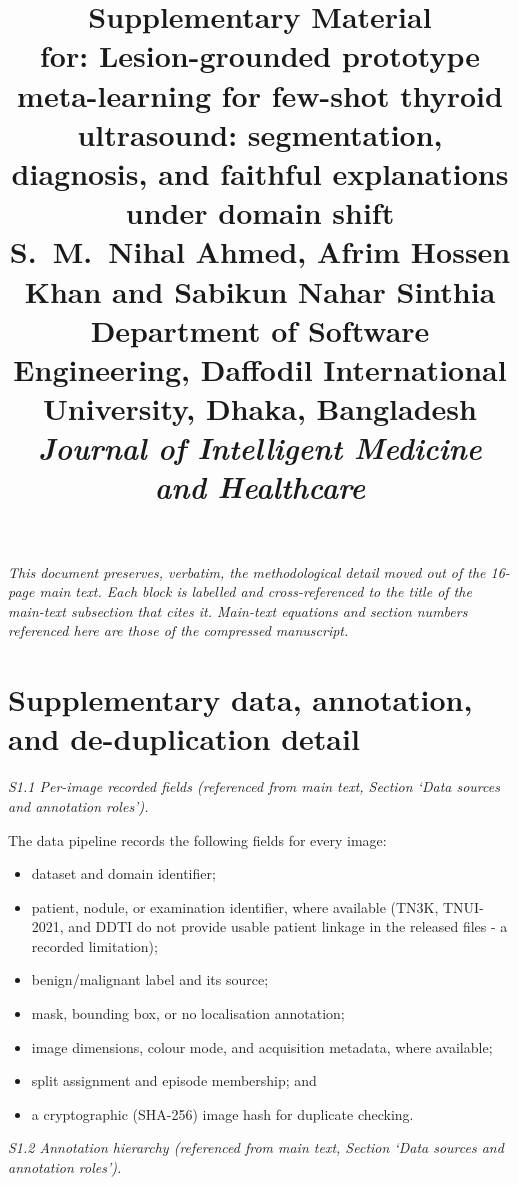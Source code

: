 \documentclass[11pt]{article}
\title{\textbf{Supplementary Material}\\[4pt]
\normalsize for: Lesion-grounded prototype meta-learning for few-shot thyroid
ultrasound: segmentation, diagnosis, and faithful explanations under
domain shift\\[4pt]
\small S.~M.~Nihal Ahmed, Afrim Hossen Khan and Sabikun Nahar Sinthia\\[2pt]
\small Department of Software Engineering, Daffodil International University, Dhaka, Bangladesh\\[4pt]
\small \emph{Journal of Intelligent Medicine and Healthcare}}
\author{}
\date{}
\begin{document}
\maketitle

\noindent\emph{This document preserves, verbatim, the methodological
detail moved out of the 16-page main text. Each block is labelled and
cross-referenced to the title of the main-text subsection that cites
it. Main-text equations and section numbers referenced here are those
of the compressed manuscript.}


\section{Supplementary data, annotation, and de-duplication detail}\label{sm:data}

\noindent\emph{S1.1 Per-image recorded fields (referenced from main text, Section `Data sources and annotation roles').}

The data pipeline records the following fields for every image:

\begin{itemize}
  \item dataset and domain identifier;
  \item patient, nodule, or examination identifier, where available
  (TN3K, TNUI-2021, and DDTI do not provide usable patient linkage in the
  released files - a recorded limitation);
  \item benign/malignant label and its source;
  \item mask, bounding box, or no localisation annotation;
  \item image dimensions, colour mode, and acquisition metadata, where
  available;
  \item split assignment and episode membership; and
  \item a cryptographic (SHA-256) image hash for duplicate checking.
\end{itemize}

\noindent\emph{S1.2 Annotation hierarchy (referenced from main text, Section `Data sources and annotation roles').}
\end{document}
